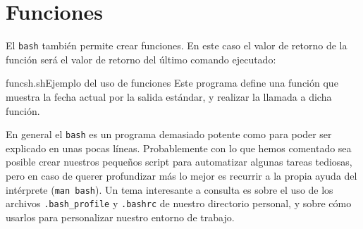 \section{Funciones}

El {\tt bash}  también permite crear funciones. En este  caso el valor
de retorno de  la función será el valor de  retorno del último comando
ejecutado:

\begin{ejemplo}{funcsh.sh}{Ejemplo del uso de funciones}
Este programa define una función que muestra la fecha actual por la
salida estándar, y realizar la llamada a dicha función.
\end{ejemplo}

En general  el {\tt bash} es  un programa demasiado potente  como para
poder  ser  explicado  en  unas pocas  líneas.  Probablemente  con  lo
que  hemos  comentado  sea  posible  crear  nuestros  pequeños  script
para  automatizar algunas  tareas  tediosas, pero  en  caso de  querer
profundizar más lo mejor es recurrir  a la propia ayuda del intérprete
({\tt  man bash}).  Un tema  interesante a  consulta es  sobre el  uso
de  los  archivos {\tt  .bash\_profile}  y  {\tt .bashrc}  de  nuestro
directorio personal,  y sobre  cómo usarlos para  personalizar nuestro
entorno de trabajo.

